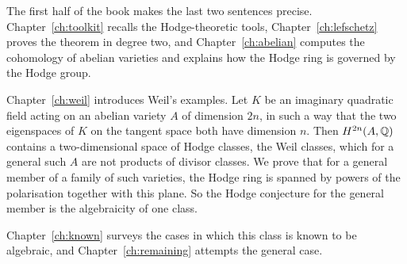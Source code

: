 The first half of the book makes the last two sentences precise.
Chapter~\ref{ch:toolkit} recalls the Hodge-theoretic tools,
Chapter~\ref{ch:lefschetz} proves the theorem in degree two, and
Chapter~\ref{ch:abelian} computes the cohomology of abelian varieties and
explains how the Hodge ring is governed by the Hodge group.

Chapter~\ref{ch:weil} introduces Weil's examples. Let $K$ be an imaginary
quadratic field acting on an abelian variety $A$ of dimension $2n$, in such
a way that the two eigenspaces of $K$ on the tangent space both have
dimension $n$. Then $H^{2n}(A,\mathbb{Q})$ contains a two-dimensional space of
Hodge classes, the Weil classes, which for a general such $A$ are not
products of divisor classes. We prove that for a general member of a family
of such varieties, the Hodge ring is spanned by powers of the polarisation
together with this plane. So the Hodge conjecture for the general member
is the algebraicity of one class.

Chapter~\ref{ch:known} surveys the cases in which this class is known to
be algebraic, and Chapter~\ref{ch:remaining} attempts the general case.

